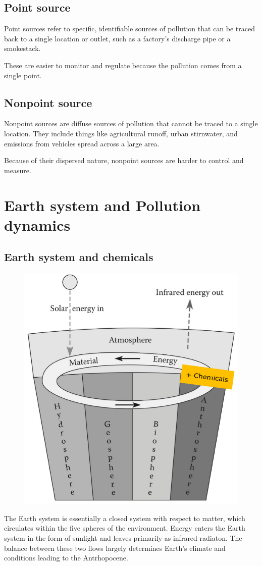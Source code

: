 \documentclass{article}
\begin{document}
\subsection{Point source}
Point sources refer to specific, identifiable sources of pollution that can be traced back
to a single location or outlet, such as a factory's discharge pipe or a smokestack.

These are easier to monitor and regulate because the pollution comes from a single point.

\subsection{Nonpoint source}
Nonpoint sources are diffuse sources of pollution that cannot be traced to a single location.
They include things like agricultural runoff, urban stirnwater, and emissions from vehicles
spread across a large area.

Because of their dispersed nature, nonpoint sources are harder to control and measure.  

\section{Earth system and Pollution dynamics}
\subsection{Earth system and chemicals}
\setlength{\intextsep}{0pt}%
\begin{figure}
    \vspace*{-1.7cm}
    \includegraphics[width=.4\textwidth]{media/earth-system7.png}
\end{figure}

\phantom{}

The Earth system is essentially a closed system with respect to matter, which circulates
within the five spheres of the environment. Energy enters the Earth system in the form of
sunlight and leaves primarily as infrared radiaton. The balance between these two flows
largely determines Earth's climate and conditions leading to the Antrhopocene.
\end{document}
